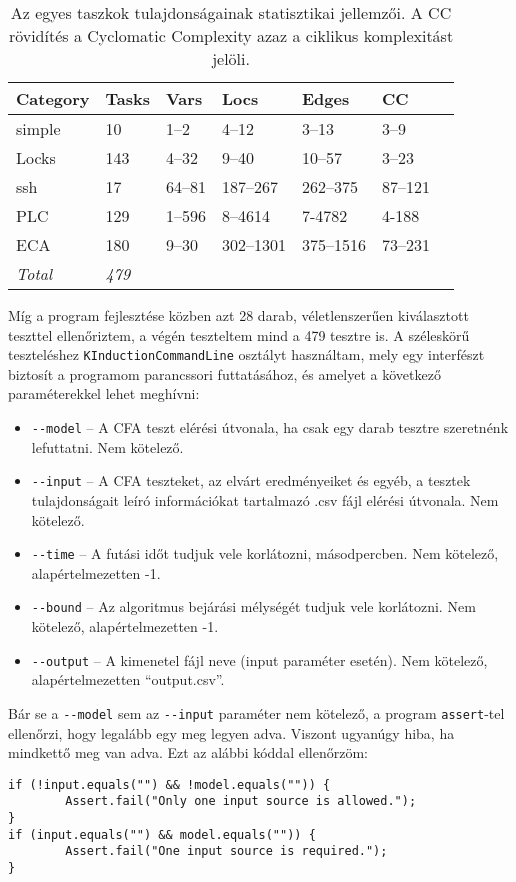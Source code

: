 \begin{table}[h] 
	\centering
	\begin{tabular}{lllllll}
		\toprule
		Category & Tasks & Vars & Locs & Edges & CC\\
		\midrule
		simple & 10 & 1--2 & 4--12 & 3--13 & 3--9\\
		Locks & 143 & 4--32 & 9--40 & 10--57 & 3--23\\
		ssh & 17 & 64--81 & 187--267 & 262--375 & 87--121\\
		PLC & 129 & 1--596 & 8--4614 & 7-4782 & 4-188\\
		ECA & 180 & 9--30 & 302--1301 & 375--1516 & 73--231\\
		
		\bottomrule
		\textit{Total} & \textit{479}\\
	\end{tabular}
	\caption{Az egyes taszkok tulajdonságainak statisztikai jellemzői. A CC rövidítés a Cyclomatic Complexity azaz a ciklikus komplexitást jelöli.}
	\label{table:tasksStat}
\end{table}

Míg a program fejlesztése közben azt 28 darab, véletlenszerűen kiválasztott teszttel ellenőriztem, a végén teszteltem mind a 479 tesztre is. A széleskörű teszteléshez \texttt{KInductionCommandLine} osztályt használtam, mely egy interfészt biztosít a programom parancssori futtatásához, és amelyet a következő paraméterekkel lehet meghívni:

\begin{itemize}
	\item \texttt{-{}-model} -- A CFA teszt elérési útvonala, ha csak egy darab tesztre szeretnénk lefuttatni. Nem kötelező.
	\item \texttt{-{}-input} -- A CFA teszteket, az elvárt eredményeiket és egyéb, a tesztek tulajdonságait leíró információkat tartalmazó .csv fájl elérési útvonala. Nem kötelező.
	\item \texttt{-{}-time} -- A futási időt tudjuk vele korlátozni, másodpercben. Nem kötelező, alapértelmezetten -1.
	\item \texttt{-{}-bound} -- Az algoritmus bejárási mélységét tudjuk vele korlátozni. Nem kötelező, alapértelmezetten -1.
	\item \texttt{-{}-output} -- A kimenetel fájl neve (input paraméter esetén). Nem kötelező, alapértelmezetten ``output.csv''.
\end{itemize}
Bár se a \texttt{-{}-model} sem az \texttt{-{}-input} paraméter nem kötelező, a program \texttt{assert}-tel ellenőrzi, hogy legalább egy meg legyen adva. Viszont ugyanúgy hiba, ha mindkettő meg van adva. Ezt az alábbi kóddal ellenőrzöm:
\ \\
\begin{lstlisting}
if (!input.equals("") && !model.equals("")) {
		Assert.fail("Only one input source is allowed.");
}
if (input.equals("") && model.equals("")) {
		Assert.fail("One input source is required.");
}
\end{lstlisting}

